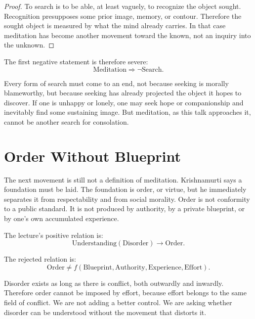 \begin{proof}
To search is to be able, at least vaguely, to recognize the object sought. Recognition presupposes some prior image, memory, or contour. Therefore the sought object is measured by what the mind already carries. In that case meditation has become another movement toward the known, not an inquiry into the unknown.
\end{proof}

The first negative statement is therefore severe:
\begin{equation}
\mathrm{Meditation} \Rightarrow \neg \mathrm{Search}.
\end{equation}

Every form of search must come to an end, not because seeking is morally blameworthy, but because seeking has already projected the object it hopes to discover. If one is unhappy or lonely, one may seek hope or companionship and inevitably find some sustaining image. But meditation, as this talk approaches it, cannot be another search for consolation.

\section{Order Without Blueprint}

The next movement is still not a definition of meditation. Krishnamurti says a foundation must be laid. The foundation is order, or virtue, but he immediately separates it from respectability and from social morality. Order is not conformity to a public standard. It is not produced by authority, by a private blueprint, or by one's own accumulated experience.

The lecture's positive relation is:
\begin{equation}
\mathrm{Understanding}(\mathrm{Disorder}) \longrightarrow \mathrm{Order}.
\end{equation}

The rejected relation is:
\begin{equation}
\mathrm{Order} \neq
f(\mathrm{Blueprint},\mathrm{Authority},\mathrm{Experience},\mathrm{Effort}).
\end{equation}

Disorder exists as long as there is conflict, both outwardly and inwardly. Therefore order cannot be imposed by effort, because effort belongs to the same field of conflict. We are not adding a better control. We are asking whether disorder can be understood without the movement that distorts it.

